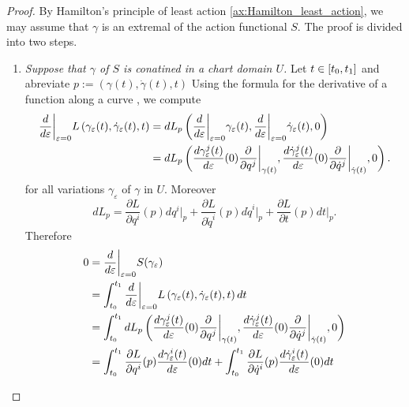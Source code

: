 \begin{proof}
	By Hamilton's principle of least action \ref{ax:Hamilton_least_action}, we may assume that $\gamma$ is an extremal of the action functional $S$. The proof is divided into two steps.
	\begin{enumerate}[label = \textit{Step \arabic*:},wide=0pt]
		\item \textit{Suppose that $\gamma$ of $S$ is conatined in a chart domain $U$.} Let $t \in \intcc[0]{t_0,t_1}$ and abreviate $p := (\gamma(t),\dot{\gamma}(t),t)$ Using the formula for the derivative of a function along a curve \cite[283]{lee:smooth_manifolds:2013}, we compute
			\begin{align*}
				\frac{d}{d\varepsilon}\bigg\vert_{\varepsilon = 0} L\del[0]{\gamma_\varepsilon(t),\dot{\gamma}_\varepsilon(t),t} &= dL_p\del[3]{\frac{d}{d\varepsilon}\bigg\vert_{\varepsilon = 0}\gamma_\varepsilon(t),\frac{d}{d\varepsilon}\bigg\vert_{\varepsilon = 0}\dot{\gamma}_\varepsilon(t),0}\\
				&= dL_p\del[3]{\frac{d\gamma_\varepsilon^j(t)}{d\varepsilon}(0)\frac{\partial}{\partial q^j}\bigg\vert_{\gamma(t)},\frac{d\dot{\gamma}_\varepsilon^j(t)}{d\varepsilon}(0)\frac{\partial}{\partial \dot{q}^j}\bigg\vert_{\dot{\gamma}(t)},0}.
			\end{align*}
			\noindent for all variations $\gamma_\varepsilon$ of $\gamma$ in $U$. Moreover
			\begin{equation*}
				dL_p = \frac{\partial L}{\partial q^i}(p) dq^i\vert_p + \frac{\partial L}{\partial \dot{q}^i}(p) d\dot{q}^i\vert_p + \frac{\partial L}{\partial t}(p)dt\vert_p.
			\end{equation*}
			Therefore
			\begin{align*}
				0 &= \frac{d}{d\varepsilon}\bigg\vert_{\varepsilon = 0} S(\gamma_\varepsilon)\\
				&= \int_{t_0}^{t_1} \frac{d}{d\varepsilon}\bigg\vert_{\varepsilon = 0} L\del[0]{\gamma_\varepsilon(t),\dot{\gamma}_\varepsilon(t),t} dt\\
				&= \int_{t_0}^{t_1} dL_p\del[3]{\frac{d\gamma_\varepsilon^j(t)}{d\varepsilon}(0)\frac{\partial}{\partial q^j}\bigg\vert_{\gamma(t)},\frac{d\dot{\gamma}_\varepsilon^j(t)}{d\varepsilon}(0)\frac{\partial}{\partial \dot{q}^j}\bigg\vert_{\dot{\gamma}(t)},0}\\
				&= \int_{t_0}^{t_1} \frac{\partial L}{\partial q^i}(p)\frac{d\gamma_\varepsilon^i(t)}{d\varepsilon}(0)dt + \int_{t_0}^{t_1}\frac{\partial L}{\partial \dot{q}^i}(p)\frac{d\dot{\gamma}_\varepsilon^i(t)}{d\varepsilon}(0)dt\\

\end{align*}
\end{enumerate}
\end{proof}

